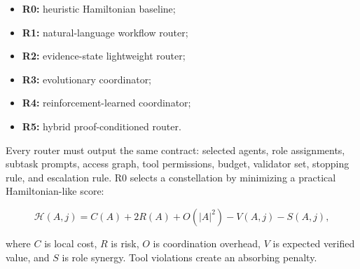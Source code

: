 \begin{itemize}
\tightlist
\item
  \textbf{R0:} heuristic Hamiltonian baseline;
\item
  \textbf{R1:} natural-language workflow router;
\item
  \textbf{R2:} evidence-state lightweight router;
\item
  \textbf{R3:} evolutionary coordinator;
\item
  \textbf{R4:} reinforcement-learned coordinator;
\item
  \textbf{R5:} hybrid proof-conditioned router.
\end{itemize}

Every router must output the same contract: selected agents, role
assignments, subtask prompts, access graph, tool permissions, budget,
validator set, stopping rule, and escalation rule. R0 selects a
constellation by minimizing a practical Hamiltonian-like score:

\[
\mathcal{H}(A,j)
=
C(A)+2R(A)+O(|A|^2)-V(A,j)-S(A,j),
\]

where \(C\) is local cost, \(R\) is risk, \(O\) is coordination
overhead, \(V\) is expected verified value, and \(S\) is role synergy.
Tool violations create an absorbing penalty.

\begin{Shaded}
\begin{Highlighting}[]
\OperatorTok{=} 
\OperatorTok{=} 
\OperatorTok{=} 
\OperatorTok{=} \NormalTok{(}
         
        \NormalTok{ team[i}\OperatorTok{+}\NormalTok{:]}
\NormalTok{    )}
\OperatorTok{=}  \OperatorTok{*}\NormalTok{ (}\OperatorTok{**} \NormalTok{)}
\OperatorTok{=} \NormalTok{(}
        \OperatorTok{\textless{}=}
\NormalTok{    )}
\OperatorTok{=}\OperatorTok{+} \OperatorTok{*}\OperatorTok{+}
\OperatorTok{{-}=}\OperatorTok{+}
      
\end{Highlighting}
\end{Shaded}

